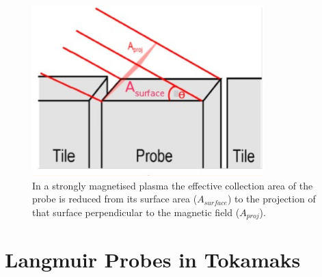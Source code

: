 \begin{figure}[H]
	\centering
	\includegraphics[width=0.8\textwidth]{projected_area.PNG}
	\caption{In a strongly magnetised plasma the effective collection area of the probe is reduced from its surface area ($A_{surface}$) to the projection of that surface perpendicular to the magnetic field ($A_{proj}$). }
	\label{fig:proj_area}
\end{figure} 
\section{Langmuir Probes in Tokamaks}

